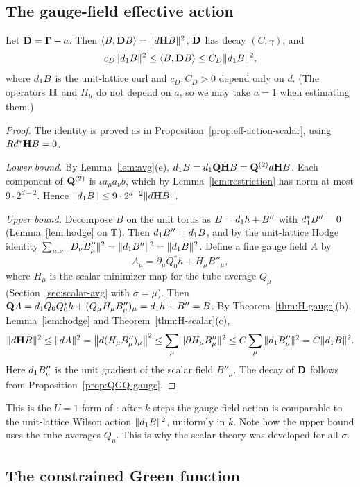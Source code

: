 \subsection{The gauge-field effective action}

\begin{proposition}\label{prop:eff-action-gauge}
Let $\mathbf D=\boldsymbol\Gamma-a$. Then $\langle B,\mathbf D B\rangle=\|d\mathbf H B\|^2$, $\mathbf D$ has decay $(C,\gamma)$, and
\[
c_D\|d_1 B\|^2\le\langle B,\mathbf D B\rangle\le C_D\|d_1 B\|^2,
\]
where $d_1 B$ is the unit-lattice curl and $c_D,C_D>0$ depend only on $d$. (The operators $\mathbf H$ and $H_\mu$ do not depend on $a$, so we may take $a=1$ when estimating them.)
\end{proposition}

\begin{proof}
The identity is proved as in Proposition~\ref{prop:eff-action-scalar}, using $Rd^*\mathbf H B=0$.

\emph{Lower bound.} By Lemma~\ref{lem:avg}(e), $d_1 B=d_1\mathbf Q\mathbf H B=\mathbf Q^{(2)}d\mathbf H B$. Each component of $\mathbf Q^{(2)}$ is $\iota a_\mu a_\nu b$, which by Lemma~\ref{lem:restriction} has norm at most $9\cdot2^{d-2}$. Hence $\|d_1 B\|\le9\cdot2^{d-2}\|d\mathbf H B\|$.

\emph{Upper bound.} Decompose $B$ on the unit torus as $B=d_1 h+B''$ with $d_1^*B''=0$ (Lemma~\ref{lem:hodge} on $\mathbb T$). Then $d_1 B''=d_1 B$, and by the unit-lattice Hodge identity $\sum_{\mu,\nu}\|D_\nu B''_\mu\|^2=\|d_1 B''\|^2=\|d_1 B\|^2$. Define a fine gauge field $A$ by
\[
A_\mu=\partial_\mu Q_0^*h+H_\mu B''_\mu,
\]
where $H_\mu$ is the scalar minimizer map for the tube average $Q_\mu$ (Section~\ref{sec:scalar-avg} with $\sigma=\mu$). Then $\mathbf Q A=d_1 Q_0Q_0^*h+(Q_\mu H_\mu B''_\mu)_\mu=d_1 h+B''=B$. By Theorem~\ref{thm:H-gauge}(b), Lemma~\ref{lem:hodge} and Theorem~\ref{thm:H-scalar}(c),
\[
\|d\mathbf H B\|^2\le\|dA\|^2=\big\|d(H_\mu B''_\mu)_\mu\big\|^2\le\sum_\mu\|\partial H_\mu B''_\mu\|^2\le C\sum_\mu\|d_1 B''_\mu\|^2=C\|d_1 B\|^2 .
\]
Here $d_1 B''_\mu$ is the unit gradient of the scalar field $B''_\mu$. The decay of $\mathbf D$ follows from Proposition~\ref{prop:QGQ-gauge}.
\end{proof}

This is the $U=1$ form of \cite[(1.66)--(1.67)]{BalPropI}: after $k$ steps the gauge-field action is comparable to the unit-lattice Wilson action $\|d_1 B\|^2$, uniformly in $k$. Note how the upper bound uses the tube averages $Q_\mu$. This is why the scalar theory was developed for all $\sigma$.

\subsection{The constrained Green function}


